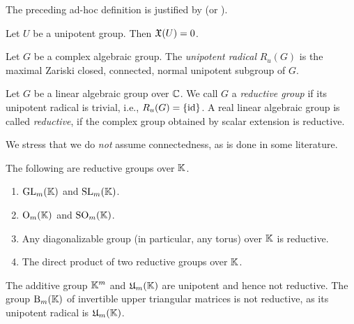 The preceding ad-hoc definition is justified by \cite[Corollary~4.8]{BorelBook} (or \cite[Theorem in 8.3]{WaterhouseBook}).

\begin{prop} \label{prop:UnipotentCharacter}
	Let $U$ be a unipotent group. Then $\mathfrak{X}(U) = 0$.
\end{prop}



\begin{defn} \label{defn:UnipotentRadical}
	Let $G$ be a complex algebraic group. The \emph{unipotent radical} $R_u(G)$ is the maximal Zariski closed, connected, normal unipotent subgroup of $G$.
\end{defn}

\begin{defn} \label{defn:ReductiveGroup}
	Let $G$ be a linear algebraic group over $\mathbb C$. We call $G$ a \emph{reductive group} if its unipotent radical is trivial, i.e., $R_u(G) = \{ \operatorname{id} \}$. A real linear algebraic group is called \emph{reductive}, if the complex group obtained by scalar extension is reductive.
	\hfill{}
\end{defn}

We stress that we do \emph{not} assume connectedness, as is done in some literature.


\begin{example}\label{ex:ReductiveGroups}
	The following are reductive groups over $\mathbb K$.
	\begin{enumerate}\itemsep 1pt
		\item $\operatorname{GL}_m(\mathbb K)$ and $\operatorname{SL}_m(\mathbb K)$.
		
		\item $\operatorname{O}_m(\mathbb K)$ and $\operatorname{SO}_m(\mathbb K)$.
		
		\item Any diagonalizable group (in particular, any torus) over $\mathbb K$ is reductive.
		
		\item The direct product of two reductive groups over $\mathbb K$.\hfill\exSymbol
	\end{enumerate}
\end{example} %

\begin{example} \label{ex:NonReductive}
	The additive group $\mathbb K^m$ and $\mathfrak{U}_m(\mathbb K)$ are unipotent and hence not reductive. The group $\operatorname{B}_m(\mathbb K)$ of invertible upper triangular matrices is not reductive, as its unipotent radical is $\mathfrak{U}_m(\mathbb K)$.
	\hfill\exSymbol
\end{example}

